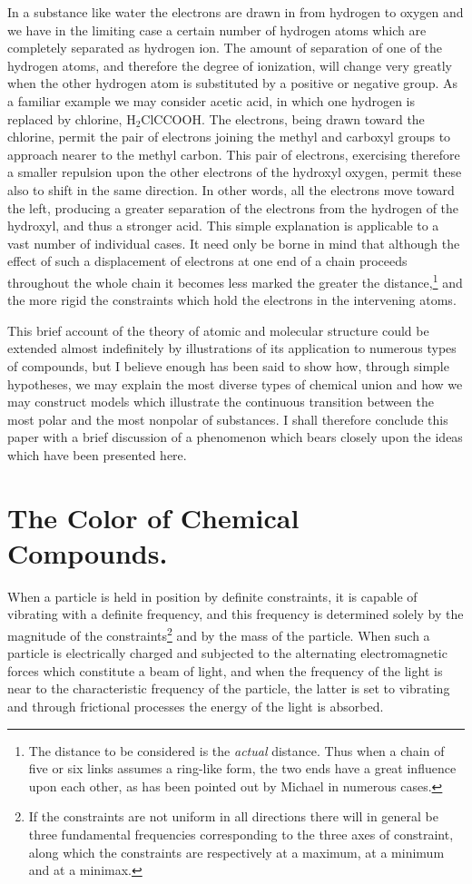 \documentclass[11pt]{memoir}
\begin{document}
In a substance like water the electrons are drawn in from hydrogen to oxygen and we have in the limiting case a certain number of hydrogen atoms which are completely separated as hydrogen ion.  The amount of separation of one of the hydrogen atoms, and therefore the degree of ionization, will change very greatly when the other hydrogen atom is substituted by a positive or negative group.  As a familiar example we may consider acetic acid, in which one hydrogen is replaced by chlorine, $\mathrm{H_2ClCCOOH}$.  The electrons, being drawn toward the chlorine, permit the pair of electrons joining the methyl and carboxyl groups to approach nearer to the methyl carbon.  This pair of electrons, exercising therefore a smaller repulsion upon the other electrons of the hydroxyl oxygen, permit these also to shift in the same direction.  In other words, all the electrons move toward the left, producing a greater separation of the electrons from the hydrogen of the hydroxyl, and thus a stronger acid.  This simple explanation is applicable to a vast number of individual cases.  It need only be borne in mind that although the effect of such a displacement of electrons at one end of a chain proceeds throughout the whole chain it becomes less marked the greater the distance,\footnote{The distance to be considered is the \emph{actual} distance.  Thus when a chain of five or six links assumes a ring-like form, the two ends have a great influence upon each other, as has been pointed out by Michael in numerous cases.} and the more rigid the constraints which hold the electrons in the intervening atoms.

This brief account of the theory of atomic and molecular structure could be extended almost indefinitely by illustrations of its application to numerous types of compounds, but I believe enough has been said to show how, through simple hypotheses, we may explain the most diverse types of chemical union and how we may construct models which illustrate the continuous transition between the most polar and the most nonpolar of substances.  I shall therefore conclude this paper with a brief discussion of a phenomenon which bears closely upon the ideas which have been presented here.

\section*{The Color of Chemical Compounds.}

When a particle is held in position by definite constraints, it is capable of vibrating with a definite frequency, and this frequency is determined solely by the magnitude of the constraints\footnote{If the constraints are not uniform in all directions there will in general be three fundamental frequencies corresponding to the three axes of constraint, along which the constraints are respectively at a maximum, at a minimum and at a minimax.} and by the mass of the particle.  When such a particle is electrically charged and subjected to the alternating electromagnetic forces which constitute a beam of light, and when the frequency of the light is near to the characteristic frequency of the particle, the latter is set to vibrating and through frictional processes the energy of the light is absorbed.
\end{document}
